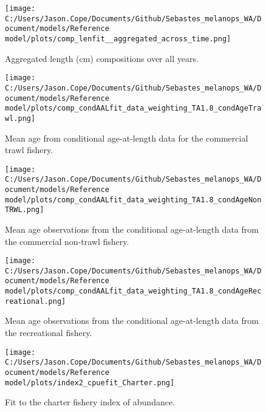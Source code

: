 \documentclass[11pt,
  letterpaper,
]{article}
\begin{document}
\pagebreak

\begin{figure}
{\centering
\texttt{[image: C:/Users/Jason.Cope/Documents/Github/Sebastes\_melanops\_WA/Document/models/Reference model/plots/comp\_lenfit\_\_aggregated\_across\_time.png]}
}
\caption{Aggregated length (cm) compositions over all years.\label{fig:agg-len-fit}}
\end{figure}

\pagebreak

\begin{figure}
{\centering
\texttt{[image: C:/Users/Jason.Cope/Documents/Github/Sebastes\_melanops\_WA/Document/models/Reference model/plots/comp\_condAALfit\_data\_weighting\_TA1.8\_condAgeTrawl.png]}
}
\caption{Mean age from conditional age-at-length data for the commercial trawl fishery.\label{fig:trawl-mean-caal}}
\end{figure}

\pagebreak

\begin{figure}
{\centering
\texttt{[image: C:/Users/Jason.Cope/Documents/Github/Sebastes\_melanops\_WA/Document/models/Reference model/plots/comp\_condAALfit\_data\_weighting\_TA1.8\_condAgeNonTRWL.png]}
}
\caption{Mean age observations from the conditional age-at-length data from the commercial non-trawl fishery.\label{fig:nontrawl-mean-caal}}
\end{figure}

\pagebreak

\begin{figure}
{\centering
\texttt{[image: C:/Users/Jason.Cope/Documents/Github/Sebastes\_melanops\_WA/Document/models/Reference model/plots/comp\_condAALfit\_data\_weighting\_TA1.8\_condAgeRecreational.png]}
}
\caption{Mean age observations from the conditional age-at-length data from the recreational fishery.\label{fig:rec-mean-caal}}
\end{figure}

\pagebreak

\begin{figure}
{\centering
\texttt{[image: C:/Users/Jason.Cope/Documents/Github/Sebastes\_melanops\_WA/Document/models/Reference model/plots/index2\_cpuefit\_Charter.png]}
}
\caption{Fit to the charter fishery index of abundance.\label{fig:charter-index-fit}}
\end{figure}
\end{document}
